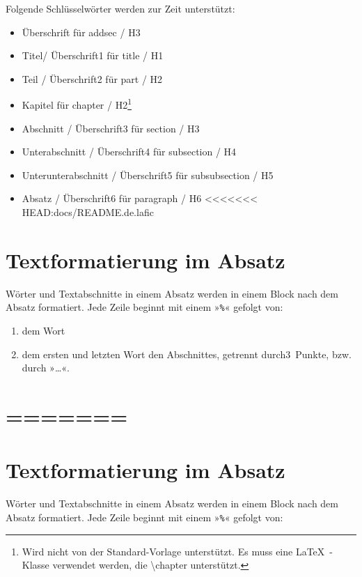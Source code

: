 \documentclass{scrartcl}
\begin{document}
{Folgende Schlüsselwörter werden zur Zeit unterstützt:\\}

\begin{itemize}
\item Überschrift für addsec / H3
\item Titel/ Überschrift1  für title / H1
\item Teil / Überschrift2 für part / H2
\item Kapitel für chapter / H2\footnote{Wird nicht von der Standard-Vorlage unterstützt. Es muss eine \LaTeX\ -Klasse verwendet werden, die \textbackslash chapter unterstützt.}\xspace  
\item Abschnitt / Überschrift3 für section / H3
\item Unterabschnitt / Überschrift4 für subsection / H4
\item Unterunterabschnitt / Überschrift5 für subsubsection / H5
\item Absatz / Überschrift6 für paragraph / H6
<<<<<<< HEAD:docs/README.de.lafic
\end{itemize}


\section{Textformatierung im Absatz}

{Wörter und Textabschnitte in einem Absatz werden in einem
Block nach dem Absatz formatiert. Jede Zeile beginnt mit
einem »\texttt{\%}« gefolgt von:\\}

\begin{enumerate}
\item dem Wort
\item dem ersten und letzten Wort den Abschnittes,
  getrennt durch3~Punkte, bzw. durch »…«.
\end{enumerate}


\section{=======}

\section{Textformatierung im Absatz}

{Wörter und Textabschnitte in einem Absatz werden in einem
Block nach dem Absatz formatiert. Jede Zeile beginnt mit
einem »\texttt{\%}« gefolgt von:\\}
\end{document}
